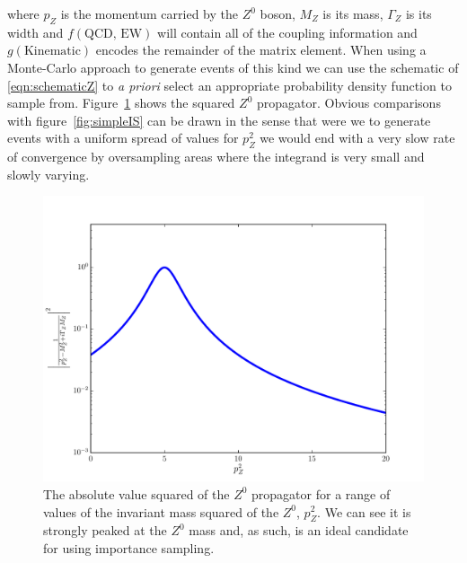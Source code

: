   	where $p_Z$ is the momentum carried by the $Z^0$ boson, $M_Z$ is its mass, $\Gamma_Z$ is its width and $f(\text{QCD, EW})$ will
  	contain all of the coupling information and $g(\text{Kinematic})$ encodes the remainder of the matrix element.  When using a
  	Monte-Carlo approach to generate events of this kind we can use the schematic of \ref{eqn:schematicZ} to \emph{a priori} select
  	an appropriate probability density function to sample from.  Figure~\ref{fig:breitWigner} shows the squared $Z^0$ propagator.
  	Obvious comparisons with figure~\ref{fig:simpleIS} can be drawn in the sense that were we to generate events with a uniform spread
  	of values for $p_Z^2$ we would end with a very slow rate of convergence by oversampling areas where the integrand is very small and slowly varying.

	\begin{figure}[htp]
		\includegraphics[width=\textwidth]{breitWigner}
		\caption{The absolute value squared of the $Z^0$ propagator for a range of values of the invariant mass squared of the
		$Z^0$, $p_Z^2$.  We can see it is strongly peaked at the $Z^0$ mass and, as such, is an ideal candidate for using importance sampling.}
		\label{fig:breitWigner}
  	\end{figure}

